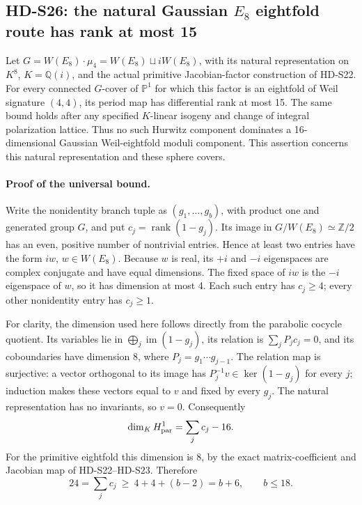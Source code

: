 \subsection{HD-S26: the natural Gaussian \(E_8\) eightfold route has rank at most 15}
\label{sec:e8-eightfold-cap}

Let \(G=W(E_8)\cdot\mu_4=W(E_8)\sqcup iW(E_8)\), with its
natural representation on \(K^8\), \(K=\mathbb Q(i)\), and the
actual primitive Jacobian-factor construction of HD-S22. For every
connected \(G\)-cover of \(\mathbb P^1\) for which this factor is
an eightfold of Weil signature \((4,4)\), its period map has
differential rank at most 15. The same bound holds after any specified
\(K\)-linear isogeny and change of integral polarization lattice.
Thus no such Hurwitz component dominates a 16-dimensional Gaussian
Weil-eightfold moduli component. This assertion concerns this natural
representation and these sphere covers.

\paragraph{Proof of the universal bound.}
Write the nonidentity branch tuple as \((g_1,\ldots,g_b)\), with
product one and generated group \(G\), and put
\(c_j=\operatorname{rank}(1-g_j)\). Its image in
\(G/W(E_8)\simeq\mathbb Z/2\) has an even, positive number of
nontrivial entries. Hence at least two entries have the form
\(iw\), \(w\in W(E_8)\). Because \(w\) is real, its
\(+i\) and \(-i\) eigenspaces are complex conjugate and have
equal dimensions. The fixed space of \(iw\) is the \(-i\)
eigenspace of \(w\), so it has dimension at most 4. Each such
entry has \(c_j\ge4\); every other nonidentity entry has
\(c_j\ge1\).

For clarity, the dimension used here follows directly from the
parabolic cocycle quotient. Its variables lie in
\(\bigoplus_j\operatorname{im}(1-g_j)\), its relation is
\(\sum_jP_jc_j=0\), and its coboundaries have dimension 8,
where \(P_j=g_1\cdots g_{j-1}\). The relation map is surjective:
a vector orthogonal to its image has
\(P_j^{-1}v\in\ker(1-g_j)\) for every \(j\); induction makes
these vectors equal to \(v\) and fixed by every \(g_j\).
The natural representation has no invariants, so \(v=0\).
Consequently
\[
 \dim_K H^1_{\rm par}=\sum_jc_j-16.
\]
For the primitive eightfold this dimension is 8, by the exact
matrix-coefficient and Jacobian map of HD-S22--HD-S23. Therefore
\[
 24=\sum_jc_j\ \ge\ 4+4+(b-2)=b+6,
 \qquad b\le18.
\]

